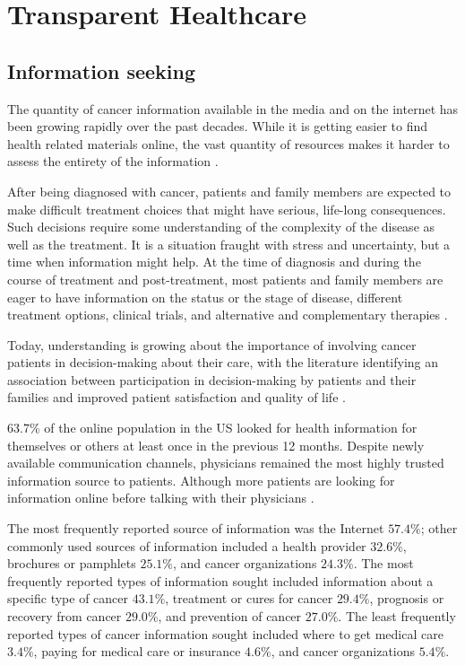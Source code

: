 \chapter{Transparent Healthcare}

\section{Information seeking}

The quantity of cancer information available in the media and on the internet has been growing rapidly over the past decades. While it is getting easier to find health related materials online, the vast quantity of resources makes it harder to assess the entirety of the information \cite{viswanath_science_2005,viswanath_communications_2012}.

After being diagnosed with cancer, patients and family members are expected to make difficult treatment choices that might have serious, life-long consequences. Such decisions require some understanding of the complexity of the disease as well as the treatment. It is a situation fraught with stress and uncertainty, but a time when information might help. At the time of diagnosis and during the course of treatment and post-treatment, most patients and family members are eager to have information on the status or the stage of disease, different treatment options, clinical trials, and alternative and complementary therapies \cite{butow_dynamics_1997,cassileth_information_1980}.

Today, understanding is growing about the importance of involving cancer patients in decision-making about their care, with the literature identifying an association between participation in decision-making by patients and their families and improved patient satisfaction and quality of life \cite{sheabudgell_information_2014}.

63.7\% of the online population in the US looked for health information for themselves or others at least once in the previous 12 months. Despite newly available communication channels, physicians remained the most highly trusted information source to patients. Although more patients are looking for information online before talking with their physicians \cite{hesse_trust_2005}.

The most frequently reported source of information was the Internet \(57.4\%\); other commonly used sources of information included a health provider \(32.6\%\), brochures or pamphlets \(25.1\%\), and cancer organizations \(24.3\%\). The most frequently reported types of information sought included information about a specific type of cancer \(43.1\%\), treatment or cures for cancer \(29.4\%\), prognosis or recovery from cancer \(29.0\%\), and prevention of cancer \(27.0\%\). The least frequently reported types of cancer information sought included where to get medical care \(3.4\%\), paying for medical care or insurance \(4.6\%\), and cancer organizations \(5.4\%\).

